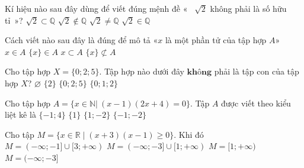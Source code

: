 \begin{ex}
Kí hiệu nào sau đây dùng để viết đúng mệnh đề «~ $\sqrt{2}$ không phải là số hữu tỉ~»?
\choice
{$\sqrt{2}\subset \mathbb{Q}$}
{\True $\sqrt{2}\notin \mathbb{Q}$}
{$\sqrt{2}\ne \mathbb{Q}$}
{$\sqrt{2}\in \mathbb{Q}$}
\end{ex}

\begin{ex}
Cách viết nào sau đây là đúng để mô tả «$x$ là một phần tử của tập hợp $A$»
\choice
{\True $x\in A$}
{$\{x\} \in A$}
{$x\subset A$}
{$\{x\} \not \subset A$}
\end{ex}

\begin{ex}
Cho tập hợp $X=\{0 ; 2 ; 5\}$. Tập hợp nào dưới đây $\textbf{không}$ phải là tập con của tập hợp $X$?
\choice
{$\varnothing$}
{$\{2\}$}
{$\{0 ; 2 ; 5\}$}
{\True $\{0 ; 1 ; 2\}$}
\end{ex}

\begin{ex}
Cho tập hợp $A=\{ x \in \mathbb{N} |~(x-1)(2x+4)=0 \}$. Tập $A$ được viết theo kiểu liệt kê là
\choice
{$\{ -1;4 \}$}
{\True $\{ 1 \}$}
{$\{ 1;-2 \}$}
{$\{ -1;-2 \}$}
\end{ex}

\begin{ex}
Cho tập $M=\{x \in \mathbb{R} \mid (x+3)(x-1) \geqslant 0\}$. Khi đó
\choice
{$M=(-\infty ;-1] \cup[3 ;+\infty)$}
{\True $M=(-\infty ;-3] \cup[1 ;+\infty)$}
{$M=[1 ;+\infty)$}
{$M=(-\infty ;-3]$}
\loigiai{
Ta có $(x+3)(x-1) \geqslant 0 \Leftrightarrow x \leqslant -3$ hoặc $x \geqslant 1$.
Vậy $M = (-\infty; -3] \cup [1; +\infty)$.
}
\end{ex}

